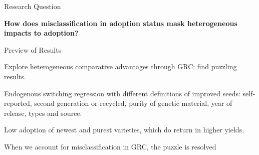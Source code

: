\documentclass{beamer}
\begin{document}
\begin{frame}{Research Question}

\textbf{How does misclassification in adoption status mask heterogeneous impacts to adoption?}
\end{frame}

\begin{frame}{Preview of Results}

\begin{enumerate}[ {[}1{]} ]
    \item Explore heterogeneous comparative advantages through GRC: find puzzling results.
    \item Endogenous switching regression with different definitions of improved seeds: self-reported, second generation or recycled, purity of genetic material, year of release, types and source.
    \item Low adoption of newest and purest varieties, which do return in higher yields. 
    \item When we account for misclassification in GRC, the puzzle is resolved
\end{enumerate}
\end{frame}
\end{document}
